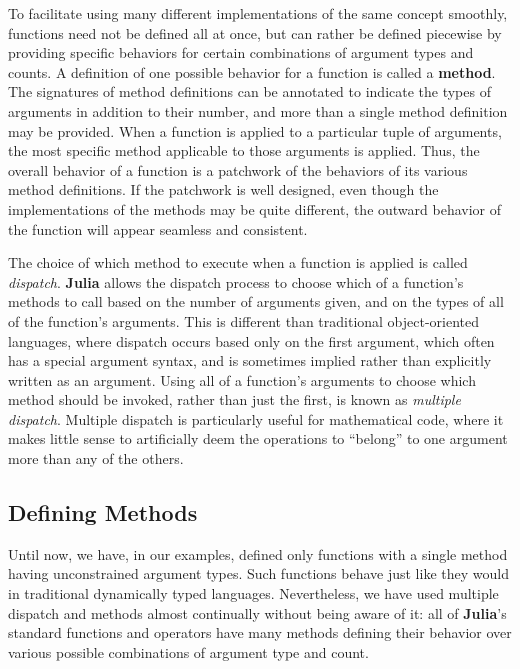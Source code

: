 \documentclass[
]{article}
\begin{document}
To facilitate using many different implementations of the same concept
smoothly, functions need not be defined all at once, but can rather be
defined piecewise by providing specific behaviors for certain
combinations of argument types and counts. A definition of one possible
behavior for a function is called a \textbf{method}. The signatures of
method definitions can be annotated to indicate the types of arguments
in addition to their number, and more than a single method definition
may be provided. When a function is applied to a particular tuple of
arguments, the most specific method applicable to those arguments is
applied. Thus, the overall behavior of a function is a patchwork of the
behaviors of its various method definitions. If the patchwork is well
designed, even though the implementations of the methods may be quite
different, the outward behavior of the function will appear seamless and
consistent.

The choice of which method to execute when a function is applied is
called \emph{dispatch}. \textbf{Julia} allows the dispatch process to
choose which of a function's methods to call based on the number of
arguments given, and on the types of all of the function's arguments.
This is different than traditional object-oriented languages, where
dispatch occurs based only on the first argument, which often has a
special argument syntax, and is sometimes implied rather than explicitly
written as an argument. Using all of a function's arguments to choose
which method should be invoked, rather than just the first, is known as
\emph{multiple dispatch}. Multiple dispatch is particularly useful for
mathematical code, where it makes little sense to artificially deem the
operations to ``belong'' to one argument more than any of the others.

\hypertarget{defining-methods}{%
\subsection{Defining Methods}\label{defining-methods}}

Until now, we have, in our examples, defined only functions with a
single method having unconstrained argument types. Such functions behave
just like they would in traditional dynamically typed languages.
Nevertheless, we have used multiple dispatch and methods almost
continually without being aware of it: all of \textbf{Julia}'s standard
functions and operators have many methods defining their behavior over
various possible combinations of argument type and count.
\end{document}
